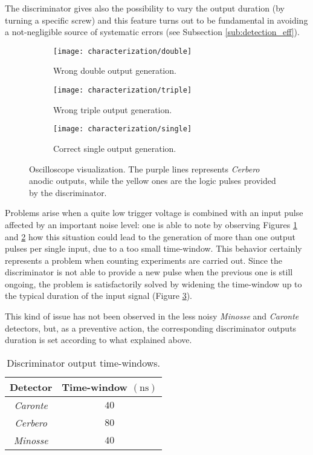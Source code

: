 The discriminator gives also the possibility to vary the output duration (by turning a specific screw) and this feature turns out to be fundamental in avoiding a not-negligible source of systematic errors (see Subsection \ref{sub:detection_eff}).
\begin{figure}[!htp]
	\centering
	\begin{subfigure}{.3\linewidth}
		\centering
		\texttt{[image: characterization/double]}
		\caption{Wrong double output generation.}
		\label{subfig:double}
	\end{subfigure}\hfill
	\begin{subfigure}{.3\linewidth}
		\centering
		\texttt{[image: characterization/triple]}
		\caption{Wrong triple output generation.}
		\label{subfig:triple}
	\end{subfigure}\hfill
	\begin{subfigure}{.3\linewidth}
		\centering
		\texttt{[image: characterization/single]}
		\caption{Correct single output generation.}
		\label{subfig:single}
	\end{subfigure}
	\caption{Oscilloscope visualization. The purple lines represents \emph{Cerbero} anodic outputs, while the yellow ones are the logic pulses provided by the discriminator.}
	\label{fig:window}
\end{figure}
Problems arise when a quite low trigger voltage is combined with an input pulse affected by an important noise level: one is able to note by observing Figures \ref{subfig:double} and \ref{subfig:triple} how this situation could lead to the generation of more than one output pulses per single input, due to a too small time-window. This behavior certainly represents a problem when counting experiments are carried out. Since the discriminator is not able to provide a new pulse when the previous one is still ongoing, the problem is satisfactorily solved by widening the time-window up to the typical duration of the input signal (Figure \ref{subfig:single}).

This kind of issue has not been observed in the less noisy \emph{Minosse} and \emph{Caronte} detectors, but, as a preventive action, the corresponding discriminator outputs duration is set according to what explained above.

\begin{table}[!htp]
	\centering
	\begin{tabular}{cc}
		\toprule
		Detector	&	Time-window $(\si{\nano\second})$ \\
		\midrule
		\emph{Caronte}	&	$40$ \\
		\emph{Cerbero}	&	$80$ \\
		\emph{Minosse}	&	$40$ \\
		\bottomrule		
	\end{tabular}
	\caption{Discriminator output time-windows.}
	\label{window}
\end{table}

